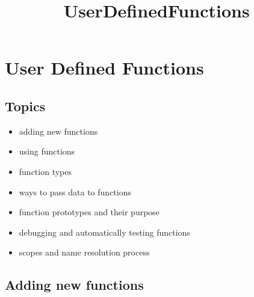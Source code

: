 \documentclass[11pt]{article}
\title{UserDefinedFunctions}
\providecommand{\tightlist}{%
      \setlength{\itemsep}{0pt}\setlength{\parskip}{0pt}}
\begin{document}
    
    \maketitle
    
    

    
    \hypertarget{user-defined-functions}{%
\section{User Defined Functions}\label{user-defined-functions}}

\hypertarget{topics}{%
\subsection{Topics}\label{topics}}

\begin{itemize}
\tightlist
\item
  adding new functions
\item
  using functions
\item
  function types
\item
  ways to pass data to functions
\item
  function prototypes and their purpose
\item
  debugging and automatically testing functions
\item
  scopes and name resolution process
\end{itemize}

    \hypertarget{adding-new-functions}{%
\subsection{Adding new functions}\label{adding-new-functions}}
\end{document}
